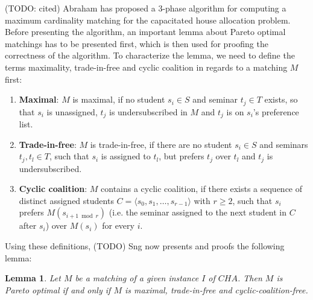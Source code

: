 (TODO: cited) Abraham \cite{Abraham:Pacha} has proposed a 3-phase algorithm for computing a maximum cardinality matching for the capacitated house allocation problem. Before presenting the algorithm, an important lemma about Pareto optimal matchings has to be presented first, which is then used for proofing the correctness of the algorithm. To characterize the lemma, we need to define the terms maximality, trade-in-free and cyclic coalition in regards to a matching $M$ first: 
\begin{enumerate}
    \item \textbf{Maximal}: $M$ is maximal, if no student $s_i \in S$ and seminar $t_j \in T$ exists, so that $s_i$ is unassigned, $t_j$ is undersubscribed in $M$ and $t_j$ is on $s_i$'s preference list.\cite{Abraham:Pacha}
    \item \textbf{Trade-in-free}: $M$ is trade-in-free, if there are no student $s_i \in S$ and seminars $t_j, t_l \in T$, such that $s_i$ is assigned to $t_l$, but prefers $t_j$ over $t_l$ and $t_j$ is undersubscribed.\cite{Abraham:Pacha} 
    \item \textbf{Cyclic coalition}: $M$ contains a cyclic coalition, if there exists a sequence of distinct assigned students $C = \langle s_0, s_1, \dots, s_{r-1} \rangle$ with $r \geq 2$, such that $s_i$ prefers $M(s_{i + 1 \bmod r})$ (i.e. the seminar assigned to the next student in $C$ after $s_i$) over $M(s_i)$ for every $i$.\cite{Abraham:Pacha}
\end{enumerate}
Using these definitions, (TODO) Sng now presents and proofs the following lemma:
\newtheorem{lemma}[theorem]{Lemma}
\begin{lemma}\label{lemma-pacha}
    Let $M$ be a matching of a given instance $I$ of $CHA$. Then $M$ is Pareto optimal if and only if $M$ is maximal, trade-in-free and cyclic-coalition-free.\cite{Abraham:Pacha}
\end{lemma}

